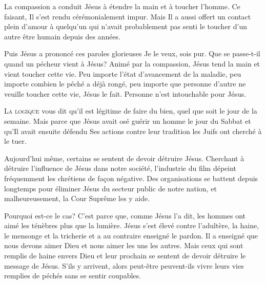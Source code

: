 
La compassion a conduit Jésus à étendre la main et à toucher l'homme.
 Ce faisant, Il s'est rendu cérémonialement impur.
 Mais Il a aussi offert un contact plein d'amour à quelqu'un
 qui n'avait probablement pas senti le toucher d'un autre être humain
 depuis des années. 

Puis Jésus a prononcé ces paroles glorieuses\frcolon{} 
 \Og Je le veux, sois pur. \Fg{}
 Que se passe-t-il quand un pécheur vient à Jésus?
 Animé par la compassion, Jésus tend la main et vient toucher cette vie.
 Peu importe l'état d'avancement de la maladie,
 peu importe combien le péché a déjà rongé, peu importe que personne
 d'autre ne veuille toucher cette vie, Jésus le fait.
 Personne n'est intouchable pour Jésus. 

\dvrule






\lettrine{L}{a logique} vous dit qu'il est légitime de faire du bien,
 quel que soit le jour de la semaine.
 Mais parce que Jésus avait osé guérir un homme le jour du Sabbat
 \ocadr et qu'Il avait ensuite défendu Ses actions contre leur tradition \fcadr{}
 les Juifs ont cherché à le tuer.

Aujourd'hui même, certains se sentent de devoir détruire Jésus.
 Cherchant à détruire l'influence de Jésus dans notre société,
 l'industrie du film dépeint fréquemment les chrétiens de fa\c{c}on négative.
 Des organisations se battent depuis longtemps pour éliminer
 Jésus du secteur public de notre nation, et malheureusement,
 la Cour Suprême
  les y aide.


Pourquoi est-ce le cas? C'est parce que, comme Jésus l'a dit,
 les hommes ont aimé les ténèbres plus que la lumière.
 Jésus s'est élevé contre l'adultère, la haine, le mensonge
 et la tricherie et a au contraire enseigné le pardon.
 Il a enseigné que nous devons aimer Dieu et nous aimer les uns les autres.
 Mais ceux qui sont remplis de haine envers Dieu et leur prochain
 se sentent de devoir détruire le message de Jésus.
 S'ils y arrivent, alors peut-être peuvent-ils vivre leurs vies
 remplies de péchés sans se sentir coupables.

